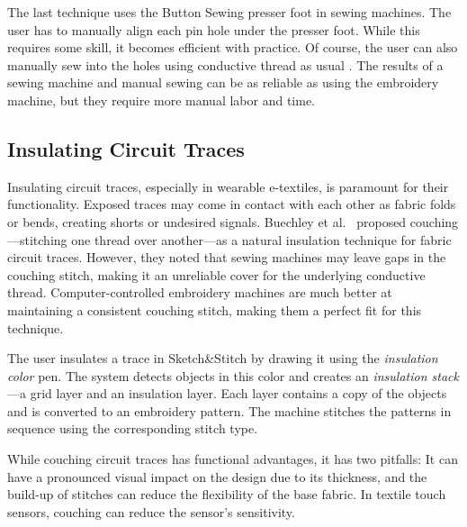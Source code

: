 \documentclass[header.tex]{subfiles}
\begin{document}



The last technique uses the Button Sewing presser foot in sewing machines. The user has to manually align each pin hole under the presser foot. While this requires some skill, it becomes efficient with practice. Of course, the user can also manually sew into the holes using conductive thread as usual \cite{Buechley:2008:LAU:1357054.1357123}.
The results of a sewing machine and manual sewing can be as reliable as using the embroidery machine, but they require more manual labor and time.


\subsection{Insulating Circuit Traces}
Insulating circuit traces, especially in wearable e-textiles, is paramount for their functionality. %
Exposed traces may come in contact with each other as fabric folds or bends, creating shorts or undesired signals. Buechley et al.\ \cite{Buechley2009} proposed couching---stitching one thread over another---as a natural insulation technique for fabric circuit traces. However, they noted that sewing machines may leave gaps in the couching stitch, making it an unreliable cover for the underlying conductive thread. Computer-controlled embroidery machines are much better at maintaining a consistent couching stitch, making them a perfect fit for this technique. 

The user insulates a trace in Sketch\&Stitch by drawing it using the \textit{insulation color} pen. The system detects objects in this color and creates an \textit{insulation stack}---a grid layer and an insulation layer. Each layer contains a copy of the objects and is converted to an embroidery pattern. The machine stitches the patterns in sequence using the corresponding stitch type. 



While couching circuit traces has functional advantages, it has two pitfalls: It can have a pronounced visual impact on the design due to its thickness, and the build-up of stitches can reduce the flexibility of the base fabric. In textile touch sensors, couching can reduce the sensor's sensitivity.
\end{document}
